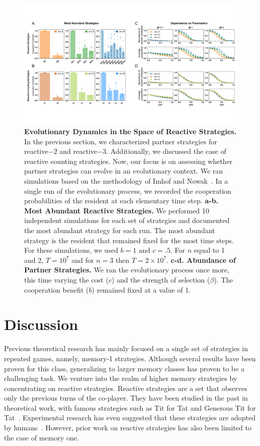 \documentclass{article}
\theoremstyle{definition}
\begin{document}
\begin{figure}[htbp]
  \centering
  \includegraphics[width=\textwidth]{figures/abundant_strategies.pdf}
  \caption{\textbf{Evolutionary Dynamics in the Space of Reactive Strategies.}
  In the previous section, we characterized partner strategies for
  reactive$-2$ and reactive$-3$. Additionally, we discussed the case of reactive
  counting strategies. Now, our focus is on assessing whether partner strategies
  can evolve in an evolutionary context. We ran simulations based on the
  methodology of Imhof and Nowak~\cite{imhof:royal:2010}. In a single run of the
  evolutionary process, we recorded the cooperation probabilities of the
  resident at each elementary time step. \textbf{a-b. Most Abundant Reactive
  Strategies.} We performed 10 independent simulations for each set of
  strategies and documented the most abundant strategy for each run. The most
  abundant strategy is the resident that remained fixed for the most time steps.
  For these simulations, we used \(b=1 \text{ and } c=.5\). For $n$ equal to 1
  and 2, \(T= 10 ^ 7\) and for $n=3$ then \(T= 2 \times10 ^ 7\).
  \textbf{c-d. Abundance of Partner Strategies.}
  We ran the evolutionary process once more, this time varying the cost ($c$)
  and the strength of selection ($\beta$). The cooperation benefit ($b$)
  remained fixed at a value of 1.}\label{fig:evolutionary_results}
\end{figure}


\section{Discussion}

Previous theoretical research has mainly focused on a single set of strategies
in repeated games, namely, memory-1 strategies. Although several results have
been proven for this class, generalizing to larger memory classes has proven to
be a challenging task. We venture into the realm of higher memory strategies by
concentrating on reactive strategies. Reactive strategies are a set that
observes only the previous turns of the co-player. They have been studied in the
past in theoretical work, with famous strategies such as Tit for Tat and
Generous Tit for Tat~\cite{nowak:Nature:1993}. Experimental research has even
suggested that these strategies are adopted by humans~\cite{engle:ET:2006,
bruttel:TD:2012}. However, prior work on reactive strategies has also been
limited to the case of memory one.
\end{document}
